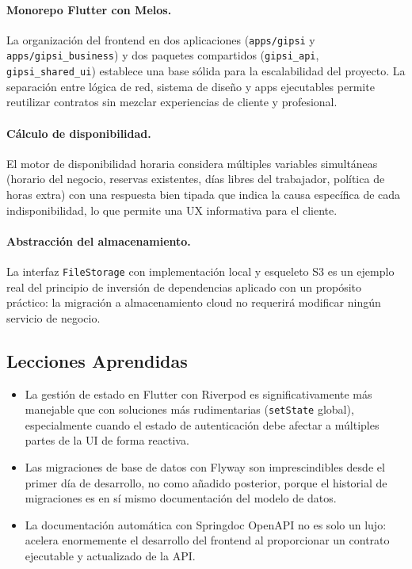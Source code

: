 \documentclass[12pt,a4paper,twoside]{report}
\begin{document}
\paragraph{Monorepo Flutter con Melos.} La organización del frontend en dos aplicaciones (\texttt{apps/gipsi} y \texttt{apps/gipsi\_business}) y dos paquetes compartidos (\texttt{gipsi\_api}, \texttt{gipsi\_shared\_ui}) establece una base sólida para la escalabilidad del proyecto. La separación entre lógica de red, sistema de diseño y apps ejecutables permite reutilizar contratos sin mezclar experiencias de cliente y profesional.

\paragraph{Cálculo de disponibilidad.} El motor de disponibilidad horaria considera múltiples variables simultáneas (horario del negocio, reservas existentes, días libres del trabajador, política de horas extra) con una respuesta bien tipada que indica la causa específica de cada indisponibilidad, lo que permite una UX informativa para el cliente.

\paragraph{Abstracción del almacenamiento.} La interfaz \texttt{FileStorage} con implementación local y esqueleto S3 es un ejemplo real del principio de inversión de dependencias aplicado con un propósito práctico: la migración a almacenamiento cloud no requerirá modificar ningún servicio de negocio.

\subsection{Lecciones Aprendidas}

\begin{itemize}
  \item La gestión de estado en Flutter con Riverpod es significativamente más manejable que con soluciones más rudimentarias (\texttt{setState} global), especialmente cuando el estado de autenticación debe afectar a múltiples partes de la UI de forma reactiva.
  \item Las migraciones de base de datos con Flyway son imprescindibles desde el primer día de desarrollo, no como añadido posterior, porque el historial de migraciones es en sí mismo documentación del modelo de datos.
  \item La documentación automática con Springdoc OpenAPI no es solo un lujo: acelera enormemente el desarrollo del frontend al proporcionar un contrato ejecutable y actualizado de la API.
\end{itemize}
\end{document}
